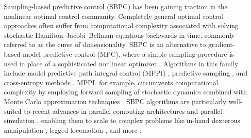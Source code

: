 \documentclass[letterpaper, 10 pt, conference]{ieeeconf}
\begin{document}
Sampling-based predictive control (SBPC) has been gaining traction in the nonlinear optimal control community. Completely general optimal control approaches often suffer from computational complexity associated with solving stochastic Hamilton--Jacobi--Bellman equations backwards in time, commonly referred to as the curse of dimensionality. SBPC is an alternative to gradient-based model predictive control (MPC), where a simple sampling procedure is used in place of a sophisticated nonlinear optimizer \cite{posa2014direct, kurtz2023inverse, aydinoglu2024consensus}. Algorithms in this family include model predictive path integral control (MPPI) \cite{williams2016aggressive}, predictive sampling \cite{howell2022predictive}, and cross-entropy methods \cite{rubinstein1999cross}. MPPI, for example, circumvents computational complexity by employing forward sampling of stochastic dynamics combined with Monte Carlo approximation techniques \cite{williams2017model}. 
SBPC algorithms are particularly well-suited to recent advances in parallel computing architectures and parallel simulation \cite{mjx, Genesis, makoviychuk2021isaac}, enabling them to scale to complex problems like in-hand dexterous manipulation \cite{li2025drop}, legged locomotion \cite{xue2025full}, and more \cite{howell2022predictive}.
\end{document}
